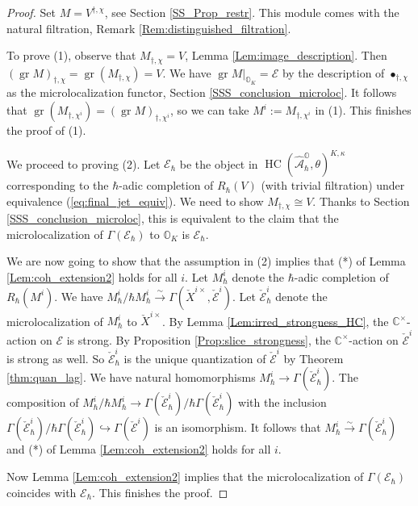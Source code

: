 \documentclass[12pt]{amsart}
\newcommand{\C}{\mathbb{C}}
\newcommand{\A}{\mathcal{A}}
\newcommand{\Orb}{\mathbb{O}}
\newcommand{\gr}{\operatorname{gr}}
\newcommand{\HC}{\operatorname{HC}}
\theoremstyle{definition}
\numberwithin{equation}{section}
\begin{document}
\begin{proof}
Set $M=V^{\dagger,\chi}$, see Section \ref{SS_Prop_restr}.
This module comes with the natural filtration, Remark \ref{Rem:distinguished_filtration}.

To prove (1), observe that $M_{\dagger,\chi}=V$, Lemma \ref{Lem:image_description}. Then
$(\gr M)_{\dagger,\chi}=\gr (M_{\dagger,\chi})=V$.
We have $\gr M|_{\Orb_K}=\mathcal{E}$ by the description of $\bullet_{\dagger,\chi}$
as the microlocalization functor, Section \ref{SSS_conclusion_microloc}.
It follows that $\gr (M_{\dagger,\chi^i})=(\gr M)_{\dagger,\chi^i}$, so we can
take $M^i:=M_{\dagger,\chi^i}$ in (1). This finishes the proof of (1).

We proceed to proving (2). Let $\mathcal{E}_\hbar$ be the object
in $\HC(\hat{\A}_\hbar^{\Orb},\theta)^{K,\kappa}$ corresponding to the
$\hbar$-adic completion of $R_\hbar(V)$ (with trivial filtration) under
equivalence (\ref{eq:final_jet_equiv}).
We need to show $M_{\dagger,\chi}\cong V$. Thanks to Section
\ref{SSS_conclusion_microloc}, this is equivalent to the claim
that the microlocalization of $\Gamma(\mathcal{E}_\hbar)$ to
$\Orb_K$ is $\mathcal{E}_\hbar$.

We are now going to show that
the assumption in (2) implies that (*) of Lemma \ref{Lem:coh_extension2}
holds for all $i$. Let $M^i_\hbar$ denote the $\hbar$-adic completion of $R_\hbar(M^i)$. We have $M^i_\hbar/\hbar M^i_\hbar\xrightarrow{\sim} \Gamma(\check{X}^{i\times}, \check{\mathcal{E}}^i)$. Let $\check{\mathcal{E}}^i_\hbar$
denote the microlocalization of $M^i_\hbar$ to $\check{X}^{i\times}$.
By Lemma  \ref{Lem:irred_strongness_HC}, the $\C^\times$-action on $\mathcal{E}$ is strong.
By Proposition \ref{Prop:slice_strongness}, the $\C^\times$-action on $\check{\mathcal{E}}^i$ is strong as well.
So $\check{\mathcal{E}}^i_\hbar$ is the unique quantization
of $\check{\mathcal{E}}^i$ by Theorem \ref{thm:quan_lag}.
We have natural homomorphisms $M^i_\hbar\rightarrow \Gamma(\check{\mathcal{E}}^i_\hbar)$.
The composition of $M^i_\hbar/\hbar M^i_\hbar\rightarrow \Gamma(\check{\mathcal{E}}^i_\hbar)/\hbar \Gamma(\check{\mathcal{E}}^i_\hbar)$ with the inclusion $\Gamma(\check{\mathcal{E}}^i_\hbar)/\hbar \Gamma(\check{\mathcal{E}}^i_\hbar)
\hookrightarrow \Gamma(\check{\mathcal{E}}^i)$ is an isomorphism. It follows that
$M^i_\hbar\xrightarrow{\sim} \Gamma(\check{\mathcal{E}}^i_\hbar)$ and (*) of Lemma
\ref{Lem:coh_extension2} holds for all $i$.

Now Lemma \ref{Lem:coh_extension2} implies that
the microlocalization of $\Gamma(\mathcal{E}_\hbar)$ coincides with $\mathcal{E}_\hbar$.
This finishes the proof.
\end{proof}
\end{document}
